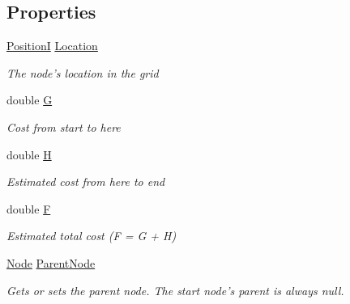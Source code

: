 \subsection*{Properties}
\begin{DoxyCompactItemize}
\item 
\hyperlink{classCore_1_1Models_1_1PositionI}{Position\-I} \hyperlink{classAStar_1_1Node_afd917b94b45e7f39ebebb8b180bf16b5}{Location}
\begin{DoxyCompactList}\small\item\em The node's location in the grid \end{DoxyCompactList}\item 
double \hyperlink{classAStar_1_1Node_ad35f9676be4b5d25936033f87a490d5d}{G}
\begin{DoxyCompactList}\small\item\em Cost from start to here \end{DoxyCompactList}\item 
double \hyperlink{classAStar_1_1Node_ac396e73b68313b7402307f6f41da8179}{H}
\begin{DoxyCompactList}\small\item\em Estimated cost from here to end \end{DoxyCompactList}\item 
double \hyperlink{classAStar_1_1Node_a2093196ab12b8969927bbd441f395558}{F}
\begin{DoxyCompactList}\small\item\em Estimated total cost (F = G + H) \end{DoxyCompactList}\item 
\hyperlink{classAStar_1_1Node}{Node} \hyperlink{classAStar_1_1Node_af01de677cce55f979bab4ce6577c9614}{Parent\-Node}
\begin{DoxyCompactList}\small\item\em Gets or sets the parent node. The start node's parent is always null. \end{DoxyCompactList}\end{DoxyCompactItemize}


